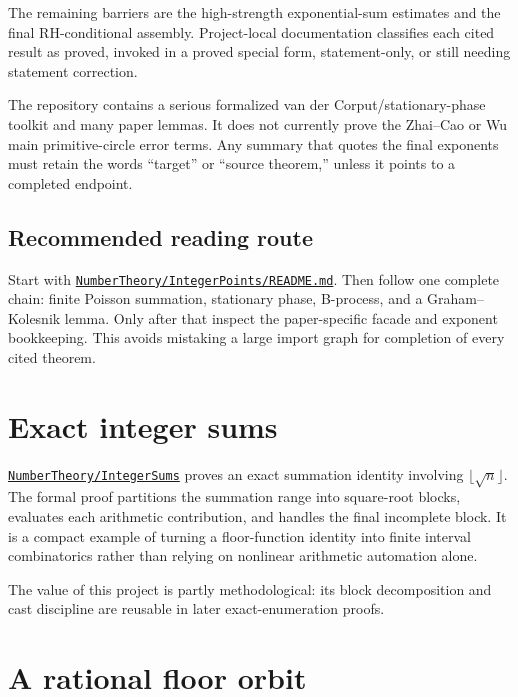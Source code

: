 \documentclass[
  10pt,
  a4paper,
  twoside,
  open=any,
  parskip=half,
  headings=big
]{scrreprt}
\newcommand{\CommitFull}{56a402bf82a9aab119fcbe3e96b991d387b221c5}
\newcommand{\RepoWeb}{https://github.com/VladimirReshetnikov/ProveIt}
\newcommand{\RepoBlobBase}{\RepoWeb/blob/\CommitFull}
\newcommand{\RepoTreeBase}{\RepoWeb/tree/\CommitFull}
\newcommand{\code}[1]{\texttt{\detokenize{#1}}}
\newcommand{\RepoFile}[1]{\href{\RepoBlobBase/#1}{\nolinkurl{#1}}}
\newcommand{\RepoDir}[1]{\href{\RepoTreeBase/#1}{\nolinkurl{#1}}}
\begin{document}
The remaining barriers are the high-strength exponential-sum estimates and the final RH-conditional assembly. Project-local documentation classifies each cited result as proved, invoked in a proved special form, statement-only, or still needing statement correction.

\begin{statusbox}
The repository contains a serious formalized van der Corput/stationary-phase toolkit and many paper lemmas. It does not currently prove the Zhai--Cao or Wu main primitive-circle error terms. Any summary that quotes the final exponents must retain the words ``target'' or ``source theorem,'' unless it points to a completed \code{..._holds} endpoint.
\end{statusbox}

\subsection{Recommended reading route}

Start with \RepoFile{NumberTheory/IntegerPoints/README.md}. Then follow one complete chain: finite Poisson summation, stationary phase, B-process, and a Graham--Kolesnik lemma. Only after that inspect the paper-specific facade and exponent bookkeeping. This avoids mistaking a large import graph for completion of every cited theorem.

\section{Exact integer sums}
\label{sec:integer-sums}

\RepoDir{NumberTheory/IntegerSums} proves an exact summation identity involving $\lfloor\sqrt n\rfloor$. The formal proof partitions the summation range into square-root blocks, evaluates each arithmetic contribution, and handles the final incomplete block. It is a compact example of turning a floor-function identity into finite interval combinatorics rather than relying on nonlinear arithmetic automation alone.

The value of this project is partly methodological: its block decomposition and cast discipline are reusable in later exact-enumeration proofs.

\section{A rational floor orbit}
\label{sec:rational-enumeration}
\end{document}
